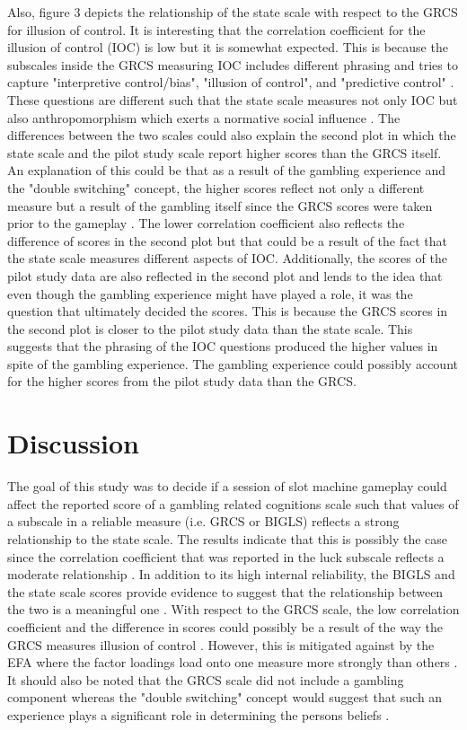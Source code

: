 \documentclass[twoside,twocolumn]{article}
\begin{document}
Also, figure 3 depicts the relationship of the state scale with respect to the GRCS for illusion of control. It is interesting that the correlation coefficient for the illusion of control (IOC) is low but it is somewhat expected. This is because the subscales inside the GRCS measuring IOC includes different phrasing and tries to capture "interpretive control/bias", "illusion of control", and "predictive control" \cite{raylu:2004}. These questions are different such that the state scale measures not only IOC but also anthropomorphism which exerts a normative social influence \cite{wyatz:2010}. The differences between the two scales could also explain the second plot in which the state scale and the pilot study scale report higher scores than the GRCS itself. An explanation of this could be that as a result of the gambling experience and the "double switching" concept, the higher scores reflect not only a different measure but a result of the gambling itself since the GRCS scores were taken prior to the gameplay \cite{sevigny:2003}. The lower correlation coefficient also reflects the difference of scores in the second plot but that could be a result of the fact that the state scale measures different aspects of IOC. Additionally, the scores of the pilot study data are also reflected in the second plot and lends to the idea that even though the gambling experience might have played a role, it was the question that ultimately decided the scores. This is because the GRCS scores in the second plot is closer to the pilot study data than the state scale. This suggests that the phrasing of the IOC questions produced the higher values in spite of the gambling experience. The gambling experience could possibly account for the higher scores from the pilot study data than the GRCS. 


\section{Discussion}
The goal of this study was to decide if a session of slot machine gameplay could affect the reported score of a gambling related cognitions scale such that values of a subscale in a reliable measure (i.e. GRCS or BIGLS) reflects a strong relationship to the state scale. The results indicate that this is possibly the case since the correlation coefficient that was reported in the luck subscale reflects a moderate relationship \cite{correlation, darke:1997}. In addition to its high internal reliability, the BIGLS and the state scale scores provide evidence to suggest that the relationship between the two is a meaningful one \cite{cronbach, efa, correlation}. With respect to the GRCS scale, the low correlation coefficient and the difference in scores could possibly be a result of the way the GRCS measures illusion of control \cite{raylu:2004}. However, this is mitigated against by the EFA where the factor loadings load onto one measure more strongly than others \cite{efa}. It should also be noted that the GRCS scale did not include a gambling component whereas the "double switching" concept would suggest that such an experience plays a significant role in determining the persons beliefs \cite{raylu:2004, sevigny:2003}.
\end{document}

